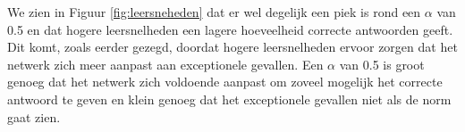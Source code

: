 We zien in Figuur \ref{fig:leersneheden} dat er wel degelijk een piek is rond een $\alpha$ van 0.5 en dat hogere leersnelheden een lagere hoeveelheid correcte antwoorden geeft. Dit komt, zoals eerder gezegd, doordat hogere leersnelheden ervoor zorgen dat het netwerk zich meer aanpast aan exceptionele gevallen. Een $\alpha$ van 0.5 is groot genoeg dat het netwerk zich voldoende aanpast om zoveel mogelijk het correcte antwoord te geven en klein genoeg dat het exceptionele gevallen niet als de norm gaat zien.